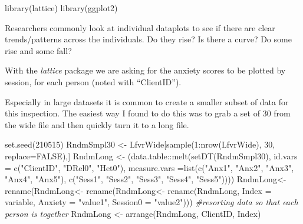 \documentclass[
  english,
]{book}
\newenvironment{Shaded}{\begin{snugshade}}{\end{snugshade}}
\newcommand{\AttributeTok}[1]{\textcolor[rgb]{0.77,0.63,0.00}{#1}}
\newcommand{\CommentTok}[1]{\textcolor[rgb]{0.56,0.35,0.01}{\textit{#1}}}
\newcommand{\ConstantTok}[1]{\textcolor[rgb]{0.00,0.00,0.00}{#1}}
\newcommand{\DecValTok}[1]{\textcolor[rgb]{0.00,0.00,0.81}{#1}}
\newcommand{\FunctionTok}[1]{\textcolor[rgb]{0.00,0.00,0.00}{#1}}
\newcommand{\NormalTok}[1]{#1}
\newcommand{\OtherTok}[1]{\textcolor[rgb]{0.56,0.35,0.01}{#1}}
\newcommand{\SpecialCharTok}[1]{\textcolor[rgb]{0.00,0.00,0.00}{#1}}
\newcommand{\StringTok}[1]{\textcolor[rgb]{0.31,0.60,0.02}{#1}}
\begin{document}
\begin{Shaded}
\begin{Highlighting}[]
\FunctionTok{library}\NormalTok{(lattice)}
\FunctionTok{library}\NormalTok{(ggplot2)}
\end{Highlighting}
\end{Shaded}

Researchers commonly look at individual dataplots to see if there are clear trends/patterns across the individuals. Do they rise? Is there a curve? Do some rise and some fall?

With the \emph{lattice} package we are asking for the anxiety scores to be plotted by session, for each person (noted with ``ClientID'').

Especially in large datasets it is common to create a smaller subset of data for this inspection. The easiest way I found to do this was to grab a set of 30 from the wide file and then quickly turn it to a long file.

\begin{Shaded}
\begin{Highlighting}[]
\FunctionTok{set.seed}\NormalTok{(}\DecValTok{210515}\NormalTok{)}
\NormalTok{RndmSmpl30 }\OtherTok{\textless{}{-}}\NormalTok{ LfvrWide[}\FunctionTok{sample}\NormalTok{(}\DecValTok{1}\SpecialCharTok{:}\FunctionTok{nrow}\NormalTok{(LfvrWide), }\DecValTok{30}\NormalTok{,}
   \AttributeTok{replace=}\ConstantTok{FALSE}\NormalTok{),] }
\NormalTok{RndmLong }\OtherTok{\textless{}{-}}\NormalTok{ (data.table}\SpecialCharTok{::}\FunctionTok{melt}\NormalTok{(}\FunctionTok{setDT}\NormalTok{(RndmSmpl30), }\AttributeTok{id.vars =} \FunctionTok{c}\NormalTok{(}\StringTok{"ClientID"}\NormalTok{, }\StringTok{"DRel0"}\NormalTok{, }\StringTok{"Het0"}\NormalTok{), }\AttributeTok{measure.vars =}\FunctionTok{list}\NormalTok{(}\FunctionTok{c}\NormalTok{(}\StringTok{"Anx1"}\NormalTok{, }\StringTok{"Anx2"}\NormalTok{, }\StringTok{"Anx3"}\NormalTok{, }\StringTok{"Anx4"}\NormalTok{, }\StringTok{"Anx5"}\NormalTok{), }\FunctionTok{c}\NormalTok{(}\StringTok{"Sess1"}\NormalTok{, }\StringTok{"Sess2"}\NormalTok{, }\StringTok{"Sess3"}\NormalTok{, }\StringTok{"Sess4"}\NormalTok{, }\StringTok{"Sess5"}\NormalTok{))))}
\NormalTok{RndmLong}\OtherTok{\textless{}{-}}  \FunctionTok{rename}\NormalTok{(RndmLong}\OtherTok{\textless{}{-}}  \FunctionTok{rename}\NormalTok{(RndmLong}\OtherTok{\textless{}{-}}  \FunctionTok{rename}\NormalTok{(RndmLong, }\AttributeTok{Index =}\NormalTok{ variable, }\AttributeTok{Anxiety =} \StringTok{"value1"}\NormalTok{, }\AttributeTok{Session0 =} \StringTok{"value2"}\NormalTok{)))}
\CommentTok{\#resorting data so that each person is together}
\NormalTok{RndmLong }\OtherTok{\textless{}{-}} \FunctionTok{arrange}\NormalTok{(RndmLong, ClientID, Index)}
\end{Highlighting}
\end{Shaded}
\end{document}
